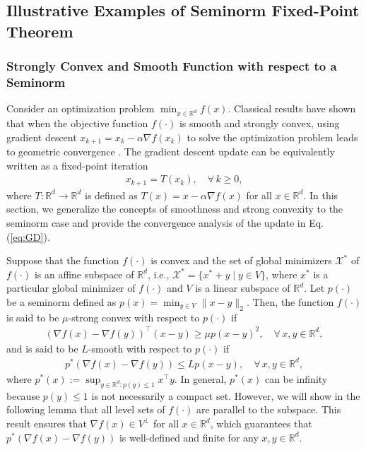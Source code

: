 \documentclass[11 pt]{article}
\begin{document}
	
	\subsection{Illustrative Examples of Seminorm Fixed-Point Theorem}\label{ap:example:optimization}
	\subsubsection{Strongly Convex and Smooth Function with respect to a Seminorm}
	Consider an optimization problem $\min_{x \in \mathbb{R}^d} f(x)$. Classical results have shown that when the objective function $f(\cdot)$ is smooth and strongly convex, using gradient descent $x_{k+1} = x_k - \alpha \nabla f(x_k)$
	to solve the optimization problem leads to geometric convergence \cite{lan2020first,beck2017first}. The gradient descent update can be equivalently written as a fixed-point iteration
	\begin{align}\label{eq:GD}
		x_{k+1}= T(x_k), \quad \forall\, k\geq 0,
	\end{align}
	where $T: \mathbb{R}^d \to \mathbb{R}^d$ is defined as $T(x)= x - \alpha \nabla f(x)$ for all $x\in\mathbb{R}^d$. In this section, we generalize the concepts of smoothness and strong convexity to the seminorm case and provide the convergence analysis of the update in Eq. (\ref{eq:GD}).
	
	Suppose that the function $f(\cdot)$ is convex and the set of global minimizers $\mathcal{X}^*$ of $f(\cdot)$ is an affine subspace of $\mathbb{R}^d$, i.e., $\mathcal{X}^* = \{x^* + y \mid y \in V\}$,
	where $x^*$ is a particular global minimizer of $f(\cdot)$ and $V$ is a linear subspace of $\mathbb{R}^d$. Let $p(\cdot)$ be a seminorm defined as $p(x) = \min_{y \in V} \| x - y \|_2$. Then, the function $f(\cdot)$ is said to be $\mu$-strong convex with respect to $p(\cdot)$ if 
	\begin{align*}
		\left(\nabla f(x) - \nabla f(y)\right)^\top \left(x-y\right)\geq \mu p\left(x-y \right)^2,\quad \forall\, x, y \in \mathbb{R}^d,
	\end{align*}
	and is said to be $L$-smooth with respect to $p(\cdot)$ if 
	\begin{align*}
		p^*\left(\nabla f(x) - \nabla f(y) \right) \leq L p\left(x-y \right), \quad \forall\, x, y \in \mathbb{R}^d,
	\end{align*}
	where $p^*(x):=\sup_{y\in\mathbb{R}^d:p(y)\leq 1}x^\top y$. In general, $p^*(x)$ can be infinity because $p(y)\leq 1$ is not necessarily a compact set. However, we will show in the following lemma that all level sets of $f(\cdot)$ are parallel to the subspace. This result ensures that $\nabla f (x) \in V^\bot$ for all $x \in 
	\mathbb{R}^d$, which guarantees that $p^*\left(\nabla f(x) - \nabla f(y) \right)$ is well-defined and finite for any $x, y \in \mathbb{R}^d$. 
	
\end{document}
